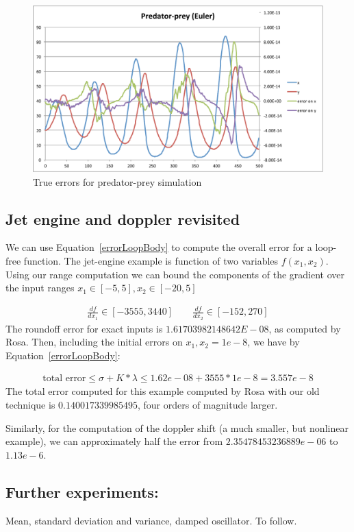 \documentclass[10pt]{article}
\newcommand{\eqn}[1]{
 \begin{align} #1
 \end{align}}
\begin{document}
\begin{figure}[h!]
  \centering
\includegraphics[width=\textwidth]{images/predator-prey}
  \caption{True errors for predator-prey simulation}
\label{fig:predator}
\end{figure}

\subsection{Jet engine and doppler revisited}
We can use Equation~\ref{errorLoopBody} to compute the overall error for
a loop-free function.
The jet-engine example is function of two variables $f(x_1, x_2)$.
Using our range computation we can bound the components of the gradient
over the input ranges $x_1 \in [-5, 5], x_2 \in [-20, 5]$
\eqn{
  \frac{d f}{d x_1} \in [-3555, 3440] \qquad \frac{d f}{d x_2} \in [-152, 270]
}
The roundoff error for exact inputs is $1.61703982148642E-08$, as computed by Rosa.
Then, including the initial errors on $x_1, x_2 = 1e-8$, we have by
Equation~\ref{errorLoopBody}:
\eqn{
\text{total error} \le \sigma + K * \lambda \le 1.62e-08 + 3555 * 1e-8 = 3.557e-8
}
The total error computed for this example computed by Rosa with our old technique
is $0.140017339985495$, four orders of magnitude larger.

Similarly, for the computation of the doppler shift (a much smaller, but nonlinear example),
we can approximately half the error from $2.35478453236889e-06$ to $1.13e-6$.

\subsection{Further experiments:}
Mean, standard deviation and variance, damped oscillator.
To follow.




\end{document}
